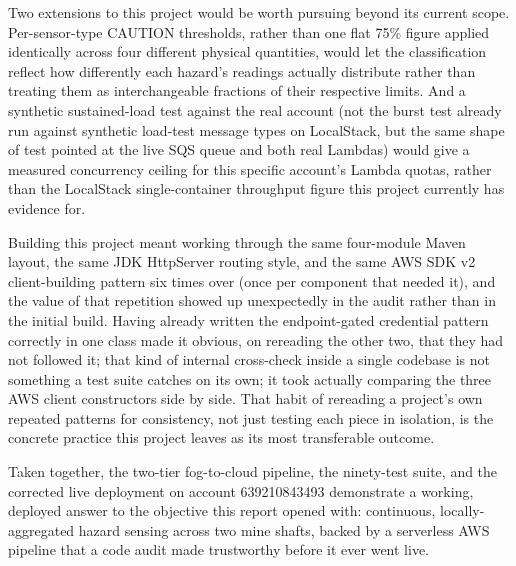 \documentclass[conference]{IEEEtran}
\begin{document}
Two extensions to this project would be worth pursuing beyond its current scope. Per-sensor-type CAUTION thresholds, rather than one flat 75\% figure applied identically across four different physical quantities, would let the classification reflect how differently each hazard's readings actually distribute rather than treating them as interchangeable fractions of their respective limits. And a synthetic sustained-load test against the real account (not the burst test already run against synthetic load-test message types on LocalStack, but the same shape of test pointed at the live SQS queue and both real Lambdas) would give a measured concurrency ceiling for this specific account's Lambda quotas, rather than the LocalStack single-container throughput figure this project currently has evidence for.

Building this project meant working through the same four-module Maven layout, the same JDK HttpServer routing style, and the same AWS SDK v2 client-building pattern six times over (once per component that needed it), and the value of that repetition showed up unexpectedly in the audit rather than in the initial build. Having already written the endpoint-gated credential pattern correctly in one class made it obvious, on rereading the other two, that they had not followed it; that kind of internal cross-check inside a single codebase is not something a test suite catches on its own; it took actually comparing the three AWS client constructors side by side. That habit of rereading a project's own repeated patterns for consistency, not just testing each piece in isolation, is the concrete practice this project leaves as its most transferable outcome.

Taken together, the two-tier fog-to-cloud pipeline, the ninety-test suite, and the corrected live deployment on account 639210843493 demonstrate a working, deployed answer to the objective this report opened with: continuous, locally-aggregated hazard sensing across two mine shafts, backed by a serverless AWS pipeline that a code audit made trustworthy before it ever went live.




\end{document}
